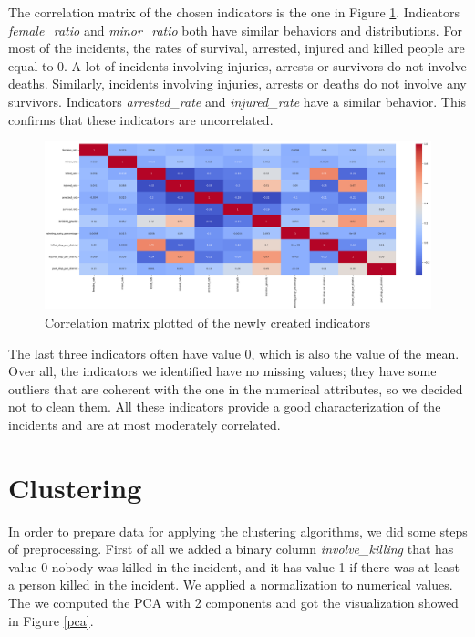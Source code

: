 \documentclass[10pt,a4paper]{report}
\begin{document}
The correlation matrix of the chosen indicators is the one in Figure \ref{corr_matrix_indicators}.
Indicators \textit{female\_ratio} and \textit{minor\_ratio} both have similar behaviors and distributions.
For most of the incidents, the rates of survival, arrested, injured and killed people are equal to 0.
A lot of incidents involving injuries, arrests or survivors do not involve deaths.
Similarly, incidents involving injuries, arrests or deaths do not involve any survivors.
Indicators \textit{arrested\_rate} and \textit{injured\_rate} have a similar behavior.
This confirms that these indicators are uncorrelated. 
\begin{figure}[h]
	\includegraphics[width=1\textwidth]{corr_matrix_indicators}
	\centering
	\caption{Correlation matrix plotted of the newly created indicators}
	\label{corr_matrix_indicators}
\end{figure}

The last three indicators often have value 0, which is also the value of the mean.
Over all, the indicators we identified have no missing values; they have some outliers that are coherent with the one in the numerical attributes, so we decided not to clean them.
All these indicators provide a good characterization of the incidents and are at most moderately correlated.

\chapter{Clustering}

In order to prepare data for applying the clustering algorithms, we did some steps of preprocessing.
First of all we added a binary column \textit{involve\_killing} that has value 0 nobody was killed in the incident, and it has value 1 if there was at least a person killed in the incident.
We applied a normalization to numerical values.
The we computed the PCA with 2 components and got the visualization showed in Figure \ref{pca}.
\end{document}
